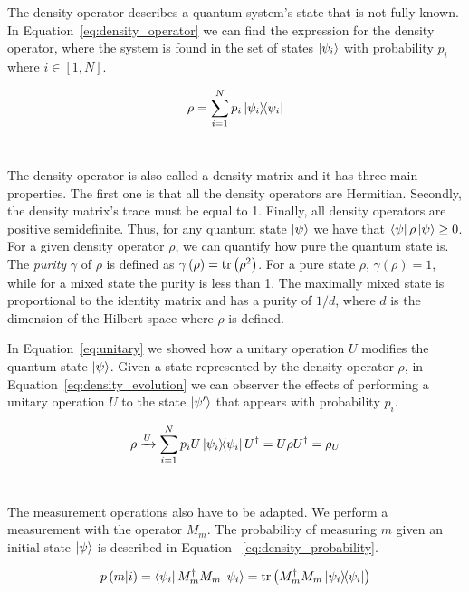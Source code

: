 The density operator describes a quantum system's state that is not
fully known. In Equation~\ref{eq:density_operator} we can find
the expression for the density operator, where the system is found
in the set of states \(\ket{\psi_i}\) with probability \(p_i\) where
\(i \in \left[1,N\right]\). \

\begin{equation}\label{eq:density_operator}
  \rho = \sum_{i=1}^{N}p_i\ketbra{\psi_i}{\psi_i}
\end{equation} \

The density operator is also called a density matrix and it has three main
properties. The first one is that all the density operators are Hermitian.
Secondly, the density matrix's trace must be equal to 1. Finally, all
density operators are positive semidefinite. Thus, for any quantum state
\(\ket{\psi}\) we have that \(\bra{\psi}\rho\ket{\psi} \geq 0\). For a
given density operator \(\rho\), we can quantify how pure the quantum
state is. The \textit{purity} \(\gamma\) of \(\rho\) is defined as 
\(\gamma\left(\rho\right) = \trace\left(\rho^2\right)\). For a pure state \(\rho\),
\(\gamma\left(\rho\right) = 1\), while for a mixed state the purity is less
than 1. The maximally mixed state is proportional to the identity matrix
and has a purity of \(1/d\), where \(d\) is the dimension of the Hilbert
space where \(\rho\) is defined. \

In Equation~\ref{eq:unitary} we showed how a unitary operation \(U\) modifies
the quantum state \(\ket{\psi}\). Given a state represented by the density
operator \(\rho\), in Equation~\ref{eq:density_evolution} we can observer the
effects of performing a unitary operation \(U\) to the state \(\ket{\psi'}\)
that appears with probability \(p_i\). \

\begin{equation}\label{eq:density_evolution}
  \rho \xrightarrow{U} \sum_{i=1}^{N}p_{i}U\ketbra{\psi_i}{\psi_i}U^{\dag} =
  U\rho U^{\dag} = \rho_{U}
\end{equation} \

The measurement operations also have to be adapted. We perform a
measurement with the operator \(M_m\). The probability of measuring
\(m\) given an initial state \(\ket{\psi}\) is described in Equation
~\ref{eq:density_probability}. \

\begin{equation}\label{eq:density_probability}
  p\left(m|i\right) = \bra{\psi_i}M_{m}^{\dag}M_{m}\ket{\psi_i} =
  \trace\left(M_{m}^{\dag}M_{m}\ketbra{\psi_i}{\psi_i}\right)
\end{equation} \

